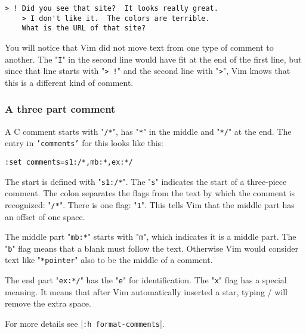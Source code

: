 \begin{Verbatim}[samepage=true]
    > ! Did you see that site?  It looks really great. 
    > I don't like it.  The colors are terrible. 
    What is the URL of that site? 
\end{Verbatim}

You will notice that Vim did not move text from one type of comment to another.
The "\texttt{I}" in the second line would have fit at the end of the first line, but since that line starts with "\texttt{> !}" and the second line with "\texttt{>}", Vim knows that this is a different kind of comment.

\subsubsection{A three part comment}
A C comment starts with "\texttt{/*}", has "\texttt{*}" in the middle and "\texttt{*/}" at the end.
The entry in \texttt{'comments'} for this looks like this:

\begin{Verbatim}[samepage=true]
 :set comments=s1:/*,mb:*,ex:*/
\end{Verbatim}

The start is defined with "\texttt{s1:/*}".
The "\texttt{s}" indicates the start of a three-piece comment.
The colon separates the flags from the text by which the comment is recognized: "\texttt{/*}".
There is one flag: "\texttt{1}".
This tells Vim that the middle part has an offset of one space.

The middle part "\texttt{mb:*}" starts with "\texttt{m}", which indicates it is a middle part.
The "\texttt{b}" flag means that a blank must follow the text.
Otherwise Vim would consider text like "\texttt{*pointer}" also to be the middle of a comment.

The end part "\texttt{ex:*/}" has the "\texttt{e}" for identification.
The "\texttt{x}" flag has a special meaning.
It means that after Vim automatically inserted a star, typing / will remove the extra space.

For more details see |\texttt{:h format-comments}|.
\clearpage
